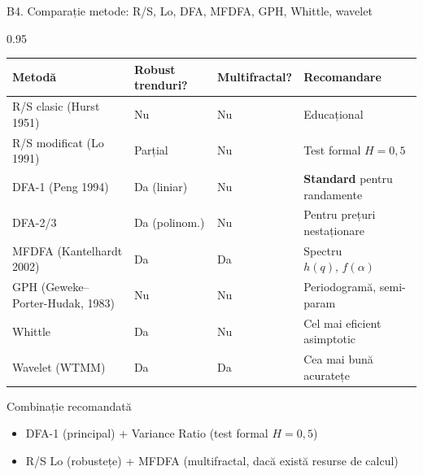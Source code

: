 \documentclass[9pt, aspectratio=169, t]{beamer}
\begin{document}
\begin{frame}[shrink=15]{B4. Comparație metode: R/S, Lo, DFA, MFDFA, GPH, Whittle, wavelet}
\begin{cminipage}{0.95\textwidth}
\renewcommand{\arraystretch}{1.2}
\centering
\small
\begin{tabular}{llll}
\toprule
\textbf{Metodă} & \textbf{Robust trenduri?} & \textbf{Multifractal?} & \textbf{Recomandare} \\
\midrule
R/S clasic (Hurst 1951) & Nu & Nu & Educațional \\
R/S modificat (Lo 1991) & Parțial & Nu & Test formal $H=0{,}5$ \\
DFA-1 (Peng 1994) & Da (liniar) & Nu & \textbf{Standard} pentru randamente \\
DFA-2/3 & Da (polinom.) & Nu & Pentru prețuri nestaționare \\
MFDFA (Kantelhardt 2002) & Da & Da & Spectru $h(q),\,f(\alpha)$ \\
GPH (Geweke--Porter-Hudak, 1983) & Nu & Nu & Periodogramă, semi-param \\
Whittle & Da & Nu & Cel mai eficient asimptotic \\
Wavelet (WTMM) & Da & Da & Cea mai bună acuratețe \\
\bottomrule
\end{tabular}
\vspace{0.15cm}
\begin{exampleblock}{Combinație recomandată}
\begin{itemize}\setlength{\itemsep}{0pt}
    \item DFA-1 (principal) + Variance Ratio (test formal $H=0{,}5$)
    \item R/S Lo (robustețe) + MFDFA (multifractal, dacă există resurse de calcul)
\end{itemize}
\end{exampleblock}
\end{cminipage}
\end{frame}
\end{document}
